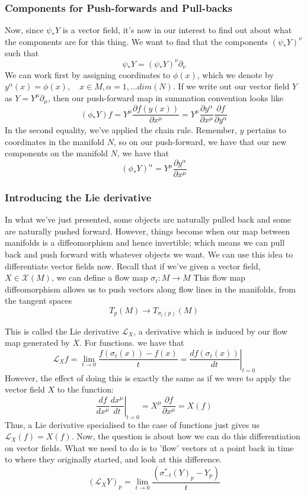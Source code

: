\subsubsection{Components for Push-forwards and Pull-backs} 
Now, since $\psi_* Y $ is a vector field, it's now in our interest to find out about what the components are for this thing. We want to find that the components $( \psi_*Y )^\nu$ such that 
\[ 
\psi_* Y  = ( \psi_* Y )^\nu \partial_\nu 
\]
We can work first by assigning coordinates to $\phi( x )$, which we denote by $y^\alpha  ( x) = \phi( x), \quad x\in M,  \alpha = 1, \dots dim(N)$. 
If we write out our vector field $Y$ as $Y  = Y^\mu\partial_\mu$, then our push-forward map in summation convention looks like 
\[ 
(\phi_* Y ) f = Y^\mu \frac{\partial f ( y ( x))}{ \partial x^\mu}  = Y^\mu \frac{ \partial y^\alpha }{ \partial x^\mu } \frac{ \partial f}{ \partial y^\alpha } 
\] 
In the second equality, we've applied the chain rule. Remember, $y$ pertains to coordinates in the manifold $N$, so on our push-forward, we have that our new components on the manifold $N$, we have that 
\[ 
(\phi_* Y )^\alpha  = Y^\mu \frac{ \partial y^\alpha }{ \partial x^\mu } 
\] 

\subsubsection{Introducing the Lie derivative} 
In what we've just presented, some objects are naturally pulled back and some are naturally pushed forward. However, things become when our map between manifolds is a diffeomorphism and hence invertible; which means we can pull back and push forward with whatever objects we want. 
We can use this idea to differentiate vector fields now. Recall that if we've given a vector field, $X \in \mathcal{X} (M )$, we can define a flow map $\sigma_t : M \rightarrow M$ This flow map diffeomorphism allows us to push vectors along flow lines in the manifolds, from the tangent spaces 
\[ 
T_p ( M ) \rightarrow T_{\sigma_t ( p )} ( M ) 
\] 

This is called the Lie derivative $\mathcal{L}_X$, a derivative which is induced by our flow map generated by $X$. For functions. we have that 
\[ 
\mathcal{L}_X f = \lim_{ t \rightarrow 0 } \frac{ f( \sigma_t ( x ))  - f( x) }{ t }  = \left. \frac{ df ( \sigma_t( x) ) }{ dt } \right\vert_{ t =0 } 
\] However, the effect of doing this is exactly the same as if we were to apply the vector field $X$ to the function: 
\[ 
\frac{ df}{ dx^\mu } \left. \frac{ dx^\mu } { dt } \right\vert_{ t = 0 }  = X^\mu \frac{ \partial f }{ \partial x^\mu }  = X( f)
\] Thus, a Lie derivative specialised to the case of functions just gives us $\mathcal{L}_X ( f)  = X( f) $. 
Now, the question is about how we can do this differentiation on vector fields. What we need to do is to 'flow' vectors at a point back in time to where they originally started, and look at this difference. 
\[ 
( \mathcal{L}_X Y )_p  = \lim_{ t \rightarrow 0 } \frac{ ( \sigma_{-t }^* (Y)_p - Y_p )  }{ t } 
\] 

